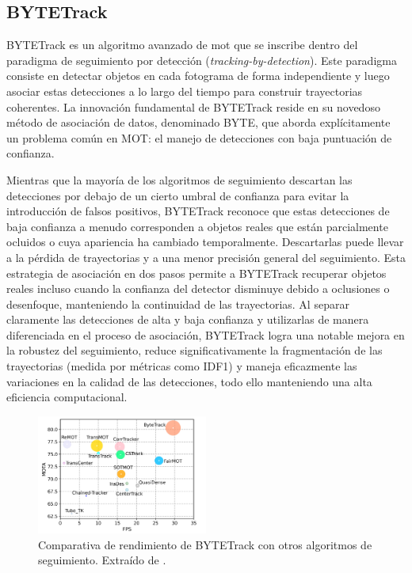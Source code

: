 \documentclass[11pt,spanish,listoffigures,listoftables]{tfgetsinf}
\begin{document}
\subsection{BYTETrack}\label{sec:bytetrack}

BYTETrack \cite{zhang2022bytetrackmultiobjecttrackingassociating} es un algoritmo avanzado de \gls{mot} que se inscribe dentro del paradigma de seguimiento por detección (\textit{tracking-by-detection}). Este paradigma consiste en detectar objetos en cada fotograma de forma independiente y luego asociar estas detecciones a lo largo del tiempo para construir trayectorias coherentes. La innovación fundamental de BYTETrack reside en su novedoso método de asociación de datos, denominado BYTE, que aborda explícitamente un problema común en MOT: el manejo de detecciones con baja puntuación de confianza.

Mientras que la mayoría de los algoritmos de seguimiento descartan las detecciones por debajo de un cierto umbral de confianza para evitar la introducción de falsos positivos, BYTETrack reconoce que estas detecciones de baja confianza a menudo corresponden a objetos reales que están parcialmente ocluidos o cuya apariencia ha cambiado temporalmente. Descartarlas puede llevar a la pérdida de trayectorias y a una menor precisión general del seguimiento. Esta estrategia de asociación en dos pasos permite a BYTETrack recuperar objetos reales incluso cuando la confianza del detector disminuye debido a oclusiones o desenfoque, manteniendo la continuidad de las trayectorias. Al separar claramente las detecciones de alta y baja confianza y utilizarlas de manera diferenciada en el proceso de asociación, BYTETrack logra una notable mejora en la robustez del seguimiento, reduce significativamente la fragmentación de las trayectorias (medida por métricas como IDF1) y maneja eficazmente las variaciones en la calidad de las detecciones, todo ello manteniendo una alta eficiencia computacional.

\begin{figure}[H]
   \centering
   \includegraphics[width=0.5\textwidth]{images/estado_del_arte/BYTETrack_MOTA.png}
   \caption[Comparativa de rendimiento de BYTETrack con otros algoritmos de seguimiento]{Comparativa de rendimiento de BYTETrack con otros algoritmos de seguimiento. Extraído de \cite[fig. 1, p.~1]{zhang2022bytetrackmultiobjecttrackingassociating}.}
   \label{fig:bytetrack_mota}
\end{figure}
\end{document}
